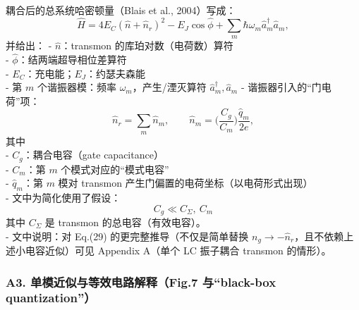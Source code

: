 \documentclass[12pt,a4paper,oneside]{ctexbook}
\begin{document}
耦合后的总系统哈密顿量（Blais et al., 2004）写成： \[
\hat H
=4E_C(\hat n+\hat n_r)^2
- E_J\cos\hat\phi
+\sum_m \hbar\omega_m \hat a_m^\dagger \hat a_m,
\tag{29}
\] 并给出： - \(\hat n\)：transmon 的库珀对数（电荷数）算符\\
- \(\hat\phi\)：结两端超导相位差算符\\
- \(E_C\)：充电能；\(E_J\)：约瑟夫森能\\
- 第 \(m\) 个谐振器模：频率 \(\omega_m\)，产生/湮灭算符
\(\hat a_m^\dagger,\hat a_m\) - 谐振器引入的``门电荷''项： \[
  \hat n_r=\sum_m \hat n_m,\qquad
  \hat n_m=\Big(\frac{C_g}{C_m}\Big)\frac{\hat q_m}{2e},
  \] 其中\\
- \(C_g\)：耦合电容（gate capacitance）\\
- \(C_m\)：第 \(m\) 个模式对应的``模式电容''\\
- \(\hat q_m\)：第 \(m\) 模对 transmon
产生门偏置的电荷坐标（以电荷形式出现）\\
- 文中为简化使用了假设：\\
\[
  C_g \ll C_\Sigma,\ C_m
  \] 其中 \(C_\Sigma\) 是 transmon 的总电容（有效电容）。\\
- 文中说明：对 Eq.(29) 的更完整推导（不仅是简单替换
\(n_g\to -\hat n_r\)，且不依赖上述小电容近似）可见 Appendix A（单个 LC
振子耦合 transmon 的情形）。

\subsubsection{\texorpdfstring{\textbf{A3. 单模近似与等效电路解释（Fig.7
与``black-box
quantization''）}}{A3. 单模近似与等效电路解释（Fig.7 与``black-box quantization''）}}\label{a3.-ux5355ux6a21ux8fd1ux4f3cux4e0eux7b49ux6548ux7535ux8defux89e3ux91cafig.7-ux4e0eblack-box-quantization}
\end{document}
